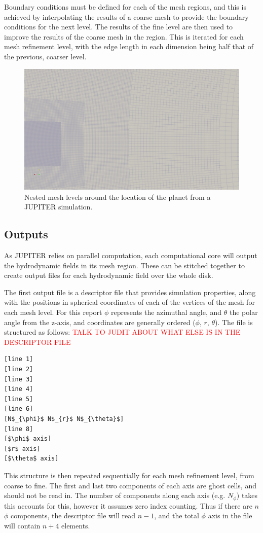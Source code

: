 \documentclass[twocolumn]{aastex62}
\begin{document}
Boundary conditions must be defined for each of the mesh regions, and this is achieved by interpolating the results of a coarse mesh to provide the boundary conditions for the next level. 
The results of the fine level are then used to improve the results of the coarse mesh in the region. 
This is iterated for each mesh refinement level, with the edge length in each dimension being half that of the previous, coarser level. 
\begin{figure}[h]
	\includegraphics[width=\linewidth]{figures/meshface.png}
	\caption{\label{fig:mesh}Nested mesh levels around the location of the planet from a JUPITER simulation.}
\end{figure}
\subsection{Outputs}\label{sec:out}
As JUPITER relies on parallel computation, each computational core will output the hydrodynamic fields in its mesh region. These can be stitched together to create output files for each hydrodynamic field over the whole disk.

The first output file is a descriptor file that provides simulation properties, along with the positions in spherical coordinates of each of the vertices of the mesh for each mesh level. 
For this report $\phi$ represents the azimuthal angle, and $\theta$ the polar angle from the z-axis, and coordinates are generally ordered ($\phi$, $r$, $\theta$). 
The file is structured as follows:
\textcolor{red}{TALK TO JUDIT ABOUT WHAT ELSE IS IN THE DESCRIPTOR FILE}
\begin{lstlisting}
[line 1]
[line 2]
[line 3]
[line 4]
[line 5]
[line 6]
[N$_{\phi}$ N$_{r}$ N$_{\theta}$]
[line 8]
[$\phi$ axis]
[$r$ axis]
[$\theta$ axis]
\end{lstlisting}
This structure is then repeated sequentially for each mesh refinement level, from coarse to fine. The first and last two components of each axis are ghost cells, and should not be read in. The number of components along each axis (e.g. $N_{\phi}$) takes this accounts for this, however it assumes zero index counting. Thus if there are $n$ $\phi$ components, the descriptor file will read $n-1$, and the total $\phi$ axis in the file will contain $n+4$ elements.
\end{document}
